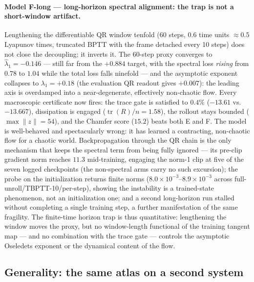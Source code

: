 \documentclass[11pt]{article}
\newcommand{\tr}{\operatorname{tr}}
\begin{document}
\paragraph{Model F-long --- long-horizon spectral alignment: the trap
is not a short-window artifact.}
Lengthening the differentiable QR window tenfold (60 steps,
$0.6$ time units $\approx0.5$ Lyapunov times, truncated BPTT with the
frame detached every 10 steps) does not close the decoupling; it
inverts it. The 60-step proxy converges to $\hat\lambda_1=-0.146$
--- still far from the $+0.884$ target, with the spectral loss
\emph{rising} from $0.78$ to $1.04$ while the total loss falls
ninefold --- and the asymptotic exponent collapses to
$\lambda_1=+0.18$ (the evaluation QR readout gives $+0.007$): the
leading axis is overdamped into a near-degenerate, effectively
non-chaotic flow. Every macroscopic certificate now fires: the trace
gate is satisfied to $0.4\%$ ($-13.61$ vs.\ $-13.667$), dissipation
is engaged ($\tr(R)/n=1.58$), the rollout stays bounded
($\max\|z\|=54$), and the Chamfer score ($15.2$) beats both E and
F. The model is well-behaved and spectacularly wrong: it has learned
a contracting, non-chaotic flow for a chaotic world. Backpropagation
through the QR chain is the only mechanism that keeps the spectral
term from being fully ignored --- its pre-clip gradient norm reaches
$11.3$ mid-training, engaging the norm-1 clip at five of the seven
logged checkpoints (the non-spectral arms carry no such excursion);
the probe on the initialization returns
finite norms ($8.0{\times}10^{-3}$--$8.9{\times}10^{-3}$ across
full-unroll/TBPTT-10/per-step), showing the instability is a
trained-state phenomenon, not an initialization one; and a second
long-horizon run stalled without completing a single training step,
a further manifestation of the same fragility. The finite-time
horizon trap is thus quantitative: lengthening the window moves the
proxy, but no window-length functional of the training tangent map
--- and no combination with the trace gate --- controls the
asymptotic Oseledets exponent or the dynamical content of the flow.

\subsection{Generality: the same atlas on a second system}
\label{sec:lz4}
\end{document}
